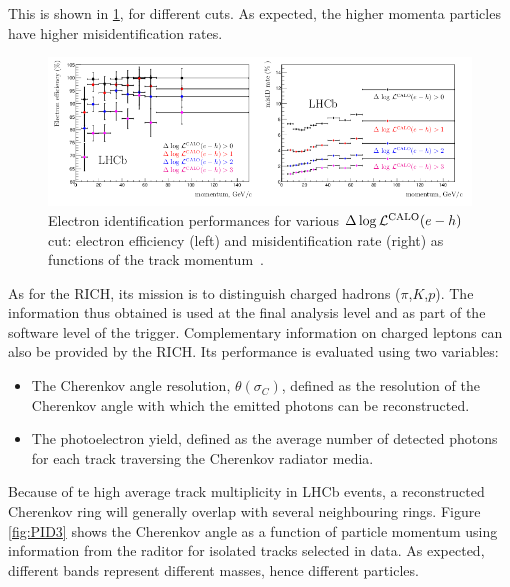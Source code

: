 This is shown in \ref{fig:PID2}, for different cuts. As expected, the higher momenta particles have higher misidentification rates. 
\begin{figure} [htb!]
\begin{center}
\includegraphics[scale=0.8]{figs/PID2.png}
\caption{Electron identification performances for various $\Delta\log{\mathcal{L}^{\rm CALO}(e-h)}$ cut: electron efficiency (left) and misidentification rate (right) as functions of the track momentum~\cite{Aaij:2014jba}.\label{fig:PID2}}
\end{center}
\end{figure}


As for the RICH, its mission is to distinguish charged hadrons ($\pi$,$K$,$p$). The information thus obtained is used at the final analysis level and as part of the software level of the trigger. Complementary information on charged leptons can also be provided by the RICH. Its performance is evaluated using two variables:
\begin{itemize}
\item The Cherenkov angle resolution, $\theta{(\sigma_C)}$, defined as the resolution of the Cherenkov angle with which the emitted photons can be reconstructed. 
\item The photoelectron yield, defined as the average number of detected photons for each track traversing the Cherenkov radiator media. 
\end{itemize}

Because of te high average track multiplicity in LHCb events, a reconstructed Cherenkov ring will generally overlap with several neighbouring rings. Figure \ref{fig:PID3} shows the Cherenkov angle as a function of particle momentum using information from the raditor for isolated tracks selected in data. As expected, different bands represent different masses, hence different particles. 

